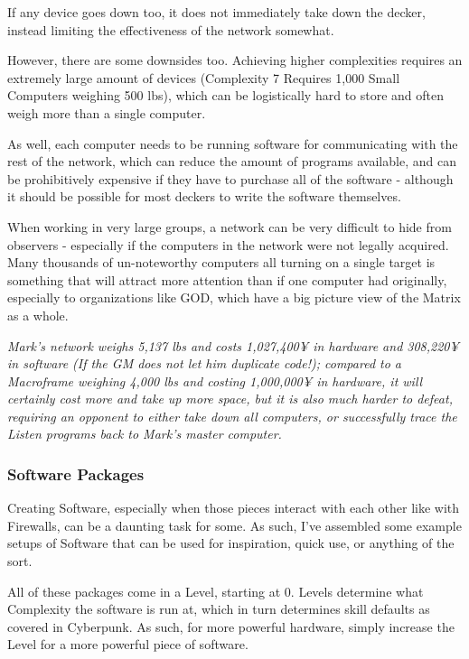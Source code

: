 \begin{multicols*}{3}
	If any device goes down too, it does not immediately take down the decker, instead limiting the effectiveness of the network somewhat.
	
	However, there are some downsides too. Achieving higher complexities requires an extremely large amount of devices (Complexity 7 Requires 1,000 Small Computers weighing 500 lbs), which can be logistically hard to store and often weigh more than a single computer. 
	
	As well, each computer needs to be running software for communicating with the rest of the network, which can reduce the amount of programs available, and can be prohibitively expensive if they have to purchase all of the software - although it should be possible for most deckers to write the software themselves. 
	
	When working in very large groups, a network can be very difficult to hide from observers - especially if the computers in the network were not legally acquired. Many thousands of un-noteworthy computers all turning on a single target is something that will attract more attention than if one computer had originally, especially to organizations like GOD, which have a big picture view of the Matrix as a whole.
	
	\textit{\textcolor{OliveGreen}{Mark's network weighs 5,137 lbs and costs 1,027,400¥ in hardware and 308,220¥ in software (If the GM does not let him duplicate code!); compared to a Macroframe weighing 4,000 lbs and costing 1,000,000¥ in hardware, it will certainly cost more and take up more space, but it is also much harder to defeat, requiring an opponent to either take down all computers, or successfully trace the Listen programs back to Mark's master computer.}}
	
	
	\subsubsection{Software Packages}\label{software_packages}
	
	Creating Software, especially when those pieces interact with each other like with Firewalls, can be a daunting task for some. As such, I've assembled some example setups of Software that can be used for inspiration, quick use, or anything of the sort.
	
	All of these packages come in a Level, starting at 0. Levels determine what Complexity the software is run at, which in turn determines skill defaults as covered in Cyberpunk. As such, for more powerful hardware, simply increase the Level for a more powerful piece of software.
	

\end{multicols*}
